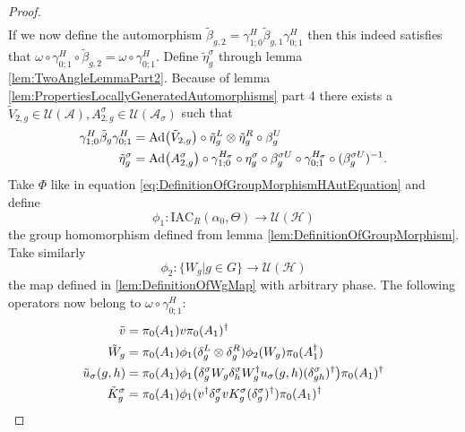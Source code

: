 \documentclass[12pt,a4paper,twoside]{article}
\newcommand{\IAC}{\textrm{IAC}}
\let\originalleft\left
\let\originalright\right
\renewcommand{\left}{\mathopen{}\mathclose\bgroup\originalleft}
\renewcommand{\right}{\aftergroup\egroup\originalright}
\newcommand{\UU}{\mathcal U}
\newcommand{\HH}{\mathcal H}
\renewcommand{\AA}{\mathcal A}
\newcommand{\Ad}[1]{\textrm{Ad}\left(#1\right)}
\theoremstyle{definition}
\numberwithin{equation}{section}
\begin{document}
\begin{proof}
\begin{align}
	\end{align}
	If we now define the automorphism $\tilde{\beta}_{g,2}=\gamma^{H}_{1;0}\tilde\beta_{g,1}\gamma^{H}_{0;1}$ then this indeed satisfies that $\omega\circ\gamma^{H}_{0;1}\circ\tilde{\beta}_{g,2}=\omega\circ\gamma^{H}_{0;1}$. Define $\tilde\eta_g^\sigma$ through lemma \ref{lem:TwoAngleLemmaPart2}. Because of lemma \ref{lem:PropertiesLocallyGeneratedAutomorphisms} part 4 there exists a $\tilde V_{2,g}\in\UU(\AA),A_{2,g}^{\sigma}\in\UU(\AA_\sigma)$ such that
	\begin{align}
		\label{eq:IndexInvariantUnderLGAEtaTildeDefiniton1}
		\gamma^{H}_{1;0}\tilde{\beta}_g\gamma^{H}_{0;1}&=\Ad{\tilde V_{2,g}}\circ\tilde{\eta}_g^L\otimes\tilde{\eta}_g^R\circ\beta_g^U\\
		\label{eq:IndexInvariantUnderLGAEtaTildeDefiniton2}
		\tilde{\eta}_g^\sigma&=\Ad{A_{2,g}^\sigma}\circ\gamma^{H_\sigma}_{1;0}\circ\eta_g^\sigma\circ\beta_g^{\sigma U}\circ\gamma^{H_\sigma}_{0;1}\circ(\beta_g^{\sigma U})^{-1}.
	\end{align}
	Take $\Phi$ like in equation \eqref{eq:DefinitionOfGroupMorphismHAutEquation} and define
	\begin{equation}
		\phi_1:\IAC_R(\alpha_0,\Theta) \rightarrow \UU(\HH)
	\end{equation}
	the group homomorphism defined from lemma \ref{lem:DefinitionOfGroupMorphism}. Take similarly
	\begin{equation}
		\phi_2:\{W_g|g\in G\}\rightarrow \UU(\HH)
	\end{equation}
	the map defined in \ref{lem:DefinitionOfWgMap} with arbitrary phase. The following operators now belong to $\omega\circ\gamma^{H}_{0;1}:$
	\begin{align}
		\label{eq:IndexInvariantUnderLGANewOperator1}
		\tilde{v}&=\pi_0(A_1)v\pi_0(A_1)^\dagger\\
		\label{eq:IndexInvariantUnderLGANewOperator2}
		\tilde{W}_g&=\pi_0(A_1)\phi_1(\delta^L_g\otimes\delta^R_g)\phi_2( W_g)\pi_0(A_1^\dagger)\\
		\label{eq:IndexInvariantUnderLGANewOperator3}
		\tilde u_\sigma(g,h)&=\pi_0(A_1) \phi_1\left(\delta^\sigma_g W_g\delta^\sigma_h W_g^\dagger u_\sigma(g,h)(\delta^\sigma_{gh})^\dagger\right)\pi_0(A_1)^\dagger\\
		\label{eq:IndexInvariantUnderLGANewOperator4}
		\tilde{K}_g^\sigma&=\pi_0(A_1)\phi_1(v^\dagger \delta_g^\sigma v K_g^\sigma (\delta_g^\sigma)^\dagger) \pi_0(A_1)^\dagger
	\end{align}

\end{proof}
\end{document}
